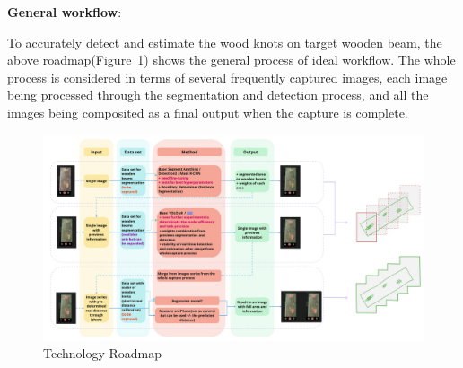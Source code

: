 \renewcommand\thesection{\arabic{section}}
\renewcommand\thesubsection{\thesection.\arabic{subsection}}

\textbf{General workflow}:

To accurately detect and estimate the wood knots on target wooden beam, the above roadmap(Figure~\ref{fig:process}) shows the general process of ideal workflow. The whole process is considered in terms of several frequently captured images, each image being processed through the segmentation and detection process, and all the images being composited as a final output when the capture is complete.

\begin{figure}[ht]
  \centering
   \includegraphics[width=1\textwidth]{Master Thesis/Images/Section_3/3-Process.jpg}
  \caption{Technology Roadmap}   
  \label{fig:process}
\end{figure}  


